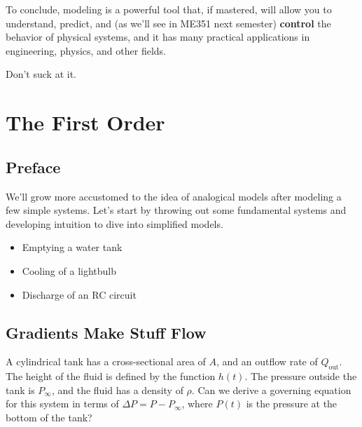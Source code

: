 \documentclass[
  letterpaper,
  DIV=11,
  numbers=noendperiod]{scrreprt}
\providecommand{\tightlist}{%
  \setlength{\itemsep}{0pt}\setlength{\parskip}{0pt}}\usepackage{longtable,booktabs,array}
\begin{document}
To conclude, modeling is a powerful tool that, if mastered, will allow
you to understand, predict, and (as we'll see in ME351 next semester)
\textbf{control} the behavior of physical systems, and it has many
practical applications in engineering, physics, and other fields.

Don't suck at it.


\hypertarget{the-first-order}{%
\chapter{The First Order}\label{the-first-order}}

\hypertarget{preface}{%
\section*{Preface}\label{preface}}


We'll grow more accustomed to the idea of analogical models after
modeling a few simple systems. Let's start by throwing out some
fundamental systems and developing intuition to dive into simplified
models.

\begin{itemize}
\tightlist
\item
  Emptying a water tank
\item
  Cooling of a lightbulb
\item
  Discharge of an RC circuit
\end{itemize}

\hypertarget{gradients-make-stuff-flow}{%
\section{Gradients Make Stuff Flow}\label{gradients-make-stuff-flow}}

A cylindrical tank has a cross-sectional area of \(A\), and an outflow
rate of \(Q_\text{out}\). The height of the fluid is defined by the
function \(h(t)\). The pressure outside the tank is \(P_{\infty}\), and
the fluid has a density of \(\rho\). Can we derive a governing equation
for this system in terms of \(\Delta P = P - P_{\infty}\), where
\(P(t)\) is the pressure at the bottom of the tank?
\end{document}
